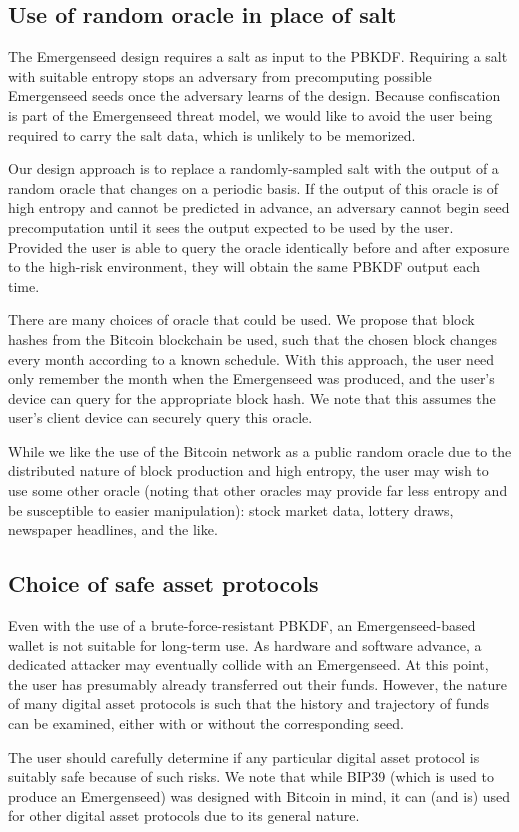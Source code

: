 \documentclass{article}
\begin{document}
\subsection{Use of random oracle in place of salt}

The Emergenseed design requires a salt as input to the PBKDF.
Requiring a salt with suitable entropy stops an adversary from precomputing possible Emergenseed seeds once the adversary learns of the design.
Because confiscation is part of the Emergenseed threat model, we would like to avoid the user being required to carry the salt data, which is unlikely to be memorized.

Our design approach is to replace a randomly-sampled salt with the output of a random oracle that changes on a periodic basis.
If the output of this oracle is of high entropy and cannot be predicted in advance, an adversary cannot begin seed precomputation until it sees the output expected to be used by the user.
Provided the user is able to query the oracle identically before and after exposure to the high-risk environment, they will obtain the same PBKDF output each time.

There are many choices of oracle that could be used.
We propose that block hashes from the Bitcoin blockchain be used, such that the chosen block changes every month according to a known schedule.
With this approach, the user need only remember the month when the Emergenseed was produced, and the user's device can query for the appropriate block hash.
We note that this assumes the user's client device can securely query this oracle.

While we like the use of the Bitcoin network as a public random oracle due to the distributed nature of block production and high entropy, the user may wish to use some other oracle (noting that other oracles may provide far less entropy and be susceptible to easier manipulation): stock market data, lottery draws, newspaper headlines, and the like.


\subsection{Choice of safe asset protocols}

Even with the use of a brute-force-resistant PBKDF, an Emergenseed-based wallet is not suitable for long-term use.
As hardware and software advance, a dedicated attacker may eventually collide with an Emergenseed.
At this point, the user has presumably already transferred out their funds.
However, the nature of many digital asset protocols is such that the history and trajectory of funds can be examined, either with or without the corresponding seed.

The user should carefully determine if any particular digital asset protocol is suitably safe because of such risks.
We note that while BIP39 (which is used to produce an Emergenseed) was designed with Bitcoin in mind, it can (and is) used for other digital asset protocols due to its general nature.
\end{document}
